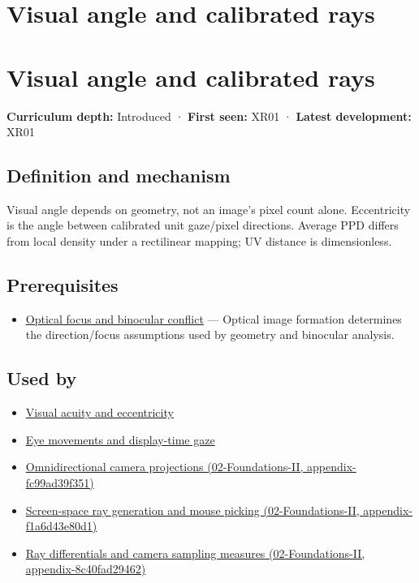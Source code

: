 \hypertarget{appendix-7d356c396d1a}{}
\section*{Visual angle and calibrated rays}
\section{Visual angle and calibrated rays}\label{appendix-7d356c396d1a-visual-angle-and-calibrated-rays}

\textbf{Curriculum depth:} Introduced · \textbf{First seen:} XR01 · \textbf{Latest development:} XR01

\subsection{Definition and mechanism}\label{appendix-7d356c396d1a-definition-and-mechanism}

Visual angle depends on geometry, not an image's pixel count alone. Eccentricity is the angle between calibrated unit gaze/pixel directions. Average PPD differs from local density under a rectilinear mapping; UV distance is dimensionless.

\subsection{Prerequisites}\label{appendix-7d356c396d1a-prerequisites}

\begin{itemize}
\tightlist
\item
  \hyperref[appendix-f90cee1be7a4]{Optical focus and binocular conflict} --- Optical image formation determines the direction/focus assumptions used by geometry and binocular analysis.
\end{itemize}

\subsection{Used by}\label{appendix-7d356c396d1a-used-by}

\begin{itemize}
\item
  \hyperref[appendix-b491fc48c54b]{Visual acuity and eccentricity}
\item
  \hyperref[appendix-a6f2c4fe1996]{Eye movements and display-time gaze}
\item
  \href{../02-Foundations-II/main.pdf\#nameddest=appendix-fc99ad39f351}{Omnidirectional camera projections (02-Foundations-II, appendix-fc99ad39f351)}
\item
  \href{../02-Foundations-II/main.pdf\#nameddest=appendix-f1a6d43e80d1}{Screen-space ray generation and mouse picking (02-Foundations-II, appendix-f1a6d43e80d1)}
\item
  \href{../02-Foundations-II/main.pdf\#nameddest=appendix-8c40fad29462}{Ray differentials and camera sampling measures (02-Foundations-II, appendix-8c40fad29462)}
\end{itemize}

